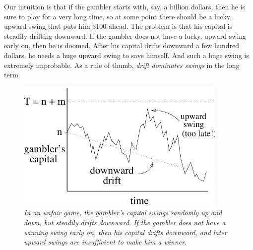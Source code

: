 Our intuition is that if the gambler starts with, say, a billion dollars,
then he is sure to play for a very long time, so at some point there
should be a lucky, upward swing that puts him \$100 ahead.  The problem is
that his capital is steadily drifting downward.  If the gambler does not
have a lucky, upward swing early on, then he is doomed.  After his capital
drifts downward a few hundred dollars, he needs a huge upward swing to
save himself.  And such a huge swing is extremely improbable.  As a rule
of thumb, \emph{drift dominates swings} in the long term.

\begin{figure}
\centerline{\includegraphics[height=2.5in]{figures/walk2}}
\caption{\em In an unfair game, the gambler's capital swings randomly up
and down, but steadily drifts downward.  If the gambler does not have
a winning swing early on, then his capital drifts downward, and later
upward swings are insufficient to make him a winner.}
\label{LN12:fig:walk2}
\end{figure}


